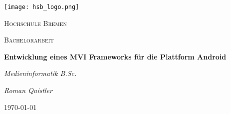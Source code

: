 \begin{titlepage}
	\centering
	\texttt{[image: hsb\_logo.png]}
	\par\vspace{1cm}
	{\scshape\LARGE Hochschule Bremen \par}
	\vspace{1cm}
	{\scshape\Large Bachelorarbeit  \par}
	\vspace{1.5cm}
	{\LARGE\bfseries Entwicklung eines MVI Frameworks für die Plattform Android\par}
	\vspace{0.5cm}
	{\normalsize\itshape Medieninformatik B.Sc. \par}
	\vspace{2cm}
	{\Large\itshape Roman Quistler \par}
	\vfill
	\vfill
	{\large\today\par}
\end{titlepage}